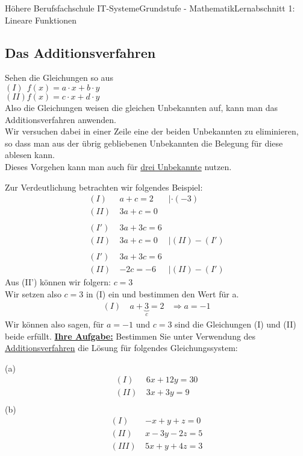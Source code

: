 \documentclass[11pt,twocolumn,oneside,openany,headings=optiontotoc,11pt,numbers=noenddot]{article}
\begin{document}
\begin{worksheet}{Höhere Berufsfachschule IT-Systeme}{Grundstufe - 
		Mathematik}{Lernabschnitt 1: Lineare Funktionen}
		\subsection{Das Additionsverfahren}
		Sehen die Gleichungen so aus\\
		\((I)\ \ f(x) = a\cdot{}x + b\cdot{}y\)\\
		\((II) f(x) = c\cdot{}x + d\cdot{}y\)\\
		Also die Gleichungen weisen die gleichen Unbekannten auf, kann man das Additionsverfahren anwenden.\\
		Wir versuchen dabei in einer Zeile eine der beiden Unbekannten zu eliminieren, so dass man aus der übrig gebliebenen Unbekannten die Belegung für diese ablesen kann.\\
		Dieses Vorgehen kann man auch für \underline{drei Unbekannte} nutzen.\\
		\par\bigskip\noindent
		Zur Verdeutlichung betrachten wir folgendes Beispiel:
		\begin{align*}
			(I)\ & a + c = 2 & |\cdot(-3)\\
			(II)\ & 3a + c = 0 \\
			\\
			(I')\ & 3a + 3c = 6\\
			(II)\ & 3a + c = 0 & |(II)-(I')\\
			\\
			(I')\ & 3a + 3c = 6\\
			(II)\ & -2c = -6 & |(II)-(I')
		\end{align*}
		Aus (II') können wir folgern: \(c = 3\)\\
		Wir setzen also \(c=3\) in (I) ein und bestimmen den Wert für a.
		\begin{align*}
			(I)\ & a + \underbrace{3}_{c} = 2 & \Rightarrow a = -1
		\end{align*}
		Wir können also sagen, für \(a = -1\) und \(c = 3\) sind die Gleichungen (I) und (II) beide erfüllt.
		\newpage
		\noindent
		\textbf{\underline{Ihre Aufgabe:}} Bestimmen Sie unter Verwendung des \underline{Additionsverfahren} die Lösung für folgendes Gleichungssystem:\\
		\par\noindent
		(a)
		\begin{align*}
			(I)\ & 6x + 12y = 30\\
			(II)\ & 3x + 3y = 9\\
		\end{align*}
		\vfill
		(b)
		\begin{align*}
			(I)\ & -x + y + z = 0\\
			(II)\ & x - 3y -2z = 5\\
			(III)\ & 5x + y + 4z = 3
		\end{align*}
		\vfill
	\end{worksheet}
\end{document}
